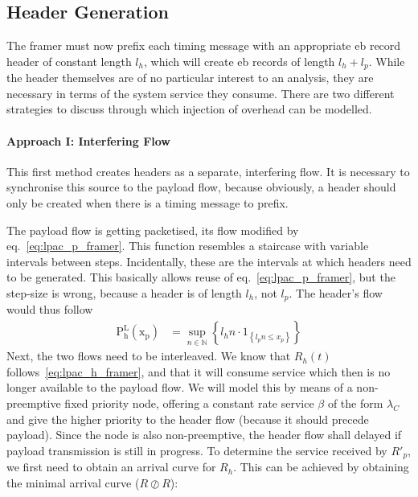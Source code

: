 \subsection{Header Generation}
\label{ssec:ebmf_hg}
The framer must now prefix each timing message with an appropriate \gls{eb} record header of constant length $l_{h}$,
which will create \gls{eb} records of length $l_{h} + l_{p}$. While the header themselves are of no particular interest to an analysis,
they are necessary in terms of the system service they consume. There are two different strategies to discuss through which injection
of overhead can be modelled.

\iffalse
\paragraph{Approach I: Interfering Flow}
This first method creates headers as a separate, interfering flow. It is necessary to synchronise this source to the payload flow, because obviously,
a header should only be created when there is a timing message to prefix.
\par
The payload flow is getting packetised, its flow modified by eq.~\ref{eq:lpac_p_framer}. This function resembles a staircase with variable
intervals between steps. Incidentally, these are the intervals at which headers need to be generated.
This basically allows reuse of eq.~\ref{eq:lpac_p_framer}, but the step-size is wrong, because a header is of length $l_h$, not $l_p$.
The header's flow would thus follow
%
\begin{align}
\mathrm{P^L_{h}(x_p)} &= \sup_{n \in \mathbb{N}}\left\{ l_h n \cdot 1_{\left\{l_p n\le x_p\right\}}\right\}
\label{eq:lpac_h_framer}
\end{align}
%
Next, the two flows need to be interleaved. We know that $R_h(t)$ follows~\ref{eq:lpac_h_framer}, and that it will consume service which then is no longer
available to the payload flow. We will model this by means of a non-preemptive fixed priority node, offering a constant rate service $\beta$ of the form $\lambda_C$ and give the higher priority to the header flow (because it should
precede payload). Since the node is also non-preemptive, the header flow shall delayed if payload transmission is still in progress.
To determine the service received by $R'_p$, we first need to obtain an arrival curve for $R_h$. This can be achieved by obtaining the minimal arrival curve ($R \oslash R$):
